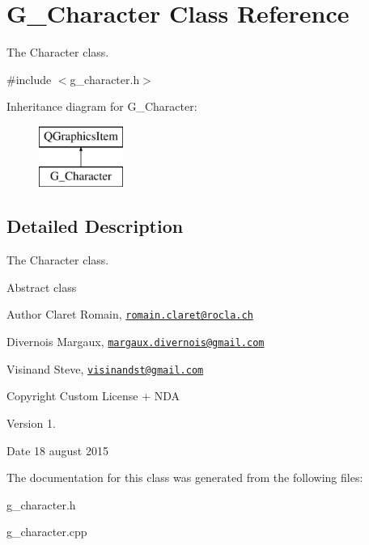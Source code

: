 \hypertarget{class_g___character}{}\section{G\+\_\+\+Character Class Reference}
\label{class_g___character}


The Character class.  




{\ttfamily \#include $<$g\+\_\+character.\+h$>$}

Inheritance diagram for G\+\_\+\+Character\+:\begin{figure}[H]
\begin{center}
\leavevmode
\includegraphics[height=2.000000cm]{class_g___character}
\end{center}
\end{figure}


\subsection{Detailed Description}
The Character class. 

Abstract class \begin{DoxyAuthor}{Author}
Claret Romain, \href{mailto:romain.claret@rocla.ch}{\tt romain.\+claret@rocla.\+ch} 

Divernois Margaux, \href{mailto:margaux.divernois@gmail.com}{\tt margaux.\+divernois@gmail.\+com} 

Visinand Steve, \href{mailto:visinandst@gmail.com}{\tt visinandst@gmail.\+com} 
\end{DoxyAuthor}
\begin{DoxyCopyright}{Copyright}
Custom License + N\+D\+A 
\end{DoxyCopyright}
\begin{DoxyVersion}{Version}
1. 
\end{DoxyVersion}
\begin{DoxyDate}{Date}
18 august 2015 
\end{DoxyDate}


The documentation for this class was generated from the following files\+:\begin{DoxyCompactItemize}
\item 
g\+\_\+character.\+h\item 
g\+\_\+character.\+cpp\end{DoxyCompactItemize}
